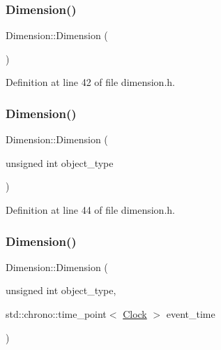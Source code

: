 \subsubsection{\texorpdfstring{Dimension()}{Dimension()}\hspace{0.1cm}{\footnotesize\ttfamily [1/4]}}
{\footnotesize\ttfamily Dimension\+::\+Dimension (\begin{DoxyParamCaption}{ }\end{DoxyParamCaption})\hspace{0.3cm}{\ttfamily [inline]}}



Definition at line 42 of file dimension.\+h.

\mbox{\label{class_dimension_a68def81e037c1bcc005591f45c53e3a3}} 
\subsubsection{\texorpdfstring{Dimension()}{Dimension()}\hspace{0.1cm}{\footnotesize\ttfamily [2/4]}}
{\footnotesize\ttfamily Dimension\+::\+Dimension (\begin{DoxyParamCaption}\item[{unsigned int}]{object\+\_\+type }\end{DoxyParamCaption})\hspace{0.3cm}{\ttfamily [inline]}}



Definition at line 44 of file dimension.\+h.

\mbox{\label{class_dimension_ab48cbe6ca22404ab5a2c522498c38d7c}} 
\subsubsection{\texorpdfstring{Dimension()}{Dimension()}\hspace{0.1cm}{\footnotesize\ttfamily [3/4]}}
{\footnotesize\ttfamily Dimension\+::\+Dimension (\begin{DoxyParamCaption}\item[{unsigned int}]{object\+\_\+type,  }\item[{std\+::chrono\+::time\+\_\+point$<$ \mbox{\hyperlink{universe_8h_a0ef8d951d1ca5ab3cfaf7ab4c7a6fd80}{Clock}} $>$}]{event\+\_\+time }\end{DoxyParamCaption})\hspace{0.3cm}{\ttfamily [inline]}}



